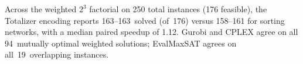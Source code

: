 Across the weighted $2^3$ factorial on 250 total instances (176 feasible), the Totalizer
encoding reports 163--163~solved (of~176) versus 158--161 for sorting networks,
with a median paired speedup of 1.12.  Gurobi and CPLEX agree on all 94~mutually
optimal weighted solutions; EvalMaxSAT agrees on all~19~overlapping instances.
